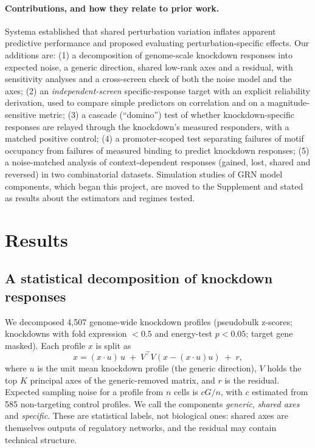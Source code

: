 \documentclass[10pt]{article}
\begin{document}
\paragraph{Contributions, and how they relate to prior work.}
Systema \citep{vinas2026systema} established that shared perturbation variation inflates apparent predictive performance and proposed evaluating perturbation-specific effects. Our additions are:
(1) a decomposition of genome-scale knockdown responses into expected noise, a generic direction, shared low-rank axes and a residual, with sensitivity analyses and a cross-screen check of both the noise model and the axes;
(2) an \emph{independent-screen} specific-response target with an explicit reliability derivation, used to compare simple predictors on correlation and on a magnitude-sensitive metric;
(3) a cascade (``domino'') test of whether knockdown-specific responses are relayed through the knockdown's measured responders, with a matched positive control;
(4) a promoter-scoped test separating failures of motif occupancy from failures of measured binding to predict knockdown responses;
(5) a noise-matched analysis of context-dependent responses (gained, lost, shared and reversed) in two combinatorial datasets.
Simulation studies of GRN model components, which began this project, are moved to the Supplement and stated as results about the estimators and regimes tested.

\section{Results}

\subsection{A statistical decomposition of knockdown responses}
\label{sec:decomp}
We decomposed 4{,}507 genome-wide knockdown profiles (pseudobulk z-scores; knockdowns with fold expression $<0.5$ and energy-test $p<0.05$; target gene masked). Each profile $x$ is split as
\[x = (x\cdot u)\,u \;+\; V^\top V(x-(x\cdot u)u) \;+\; r,\]
where $u$ is the unit mean knockdown profile (the generic direction), $V$ holds the top $K$ principal axes of the generic-removed matrix, and $r$ is the residual. Expected sampling noise for a profile from $n$ cells is $cG/n$, with $c$ estimated from 585 non-targeting control profiles.
We call the components \emph{generic}, \emph{shared axes} and \emph{specific}. These are statistical labels, not biological ones: shared axes are themselves outputs of regulatory networks, and the residual may contain technical structure.
\end{document}
